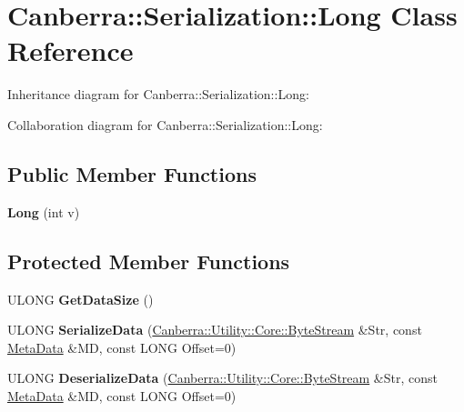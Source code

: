 \hypertarget{class_canberra_1_1_serialization_1_1_long}{}\section{Canberra\+:\+:Serialization\+:\+:Long Class Reference}
\label{class_canberra_1_1_serialization_1_1_long}


Inheritance diagram for Canberra\+:\+:Serialization\+:\+:Long\+:


Collaboration diagram for Canberra\+:\+:Serialization\+:\+:Long\+:
\subsection*{Public Member Functions}
\begin{DoxyCompactItemize}
\item 
\mbox{\label{class_canberra_1_1_serialization_1_1_long_aa703e7cf4bc2d7b5d5942c2dd8094091}} 
{\bfseries Long} (int v)
\end{DoxyCompactItemize}
\subsection*{Protected Member Functions}
\begin{DoxyCompactItemize}
\item 
\mbox{\label{class_canberra_1_1_serialization_1_1_long_a12915b0438466568a303ed5bf5c390ce}} 
U\+L\+O\+NG {\bfseries Get\+Data\+Size} ()
\item 
\mbox{\label{class_canberra_1_1_serialization_1_1_long_a9aee47bd2a9587379d3dbef5ec99aeea}} 
U\+L\+O\+NG {\bfseries Serialize\+Data} (\hyperlink{class_canberra_1_1_utility_1_1_core_1_1_byte_stream}{Canberra\+::\+Utility\+::\+Core\+::\+Byte\+Stream} \&Str, const \hyperlink{class_canberra_1_1_serialization_1_1_meta_data}{Meta\+Data} \&MD, const L\+O\+NG Offset=0)
\item 
\mbox{\label{class_canberra_1_1_serialization_1_1_long_a6ca2d7bdf83f11867819bf79df6bfc0c}} 
U\+L\+O\+NG {\bfseries Deserialize\+Data} (\hyperlink{class_canberra_1_1_utility_1_1_core_1_1_byte_stream}{Canberra\+::\+Utility\+::\+Core\+::\+Byte\+Stream} \&Str, const \hyperlink{class_canberra_1_1_serialization_1_1_meta_data}{Meta\+Data} \&MD, const L\+O\+NG Offset=0)
\end{DoxyCompactItemize}
